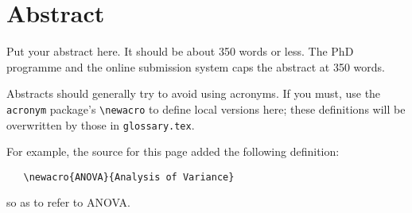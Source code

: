 \chapter{Abstract}

Put your abstract here.  It should be about 350 words or less.
The PhD programme and the online submission system caps the abstract
at 350 words.

Abstracts should generally try to avoid using acronyms.  If you
must, use the \verb+acronym+ package's \verb+\newacro+ to define
local versions here; these definitions will be overwritten by those
in \verb+glossary.tex+.

For example, the source for this page added the following definition:
\begin{verbatim}
   \newacro{ANOVA}{Analysis of Variance}
\end{verbatim}
so as to refer to \ac{ANOVA}. 
